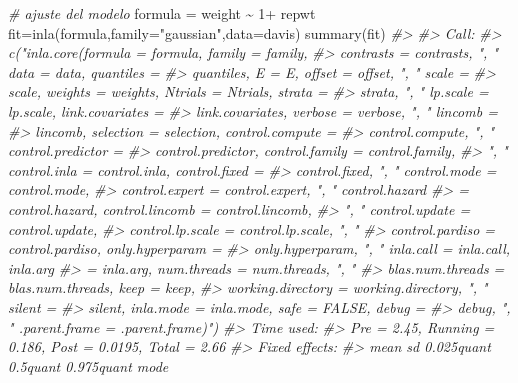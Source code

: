 \documentclass[
]{book}
\newenvironment{Shaded}{\begin{snugshade}}{\end{snugshade}}
\newcommand{\AttributeTok}[1]{\textcolor[rgb]{0.77,0.63,0.00}{#1}}
\newcommand{\CommentTok}[1]{\textcolor[rgb]{0.56,0.35,0.01}{\textit{#1}}}
\newcommand{\DecValTok}[1]{\textcolor[rgb]{0.00,0.00,0.81}{#1}}
\newcommand{\FunctionTok}[1]{\textcolor[rgb]{0.00,0.00,0.00}{#1}}
\newcommand{\NormalTok}[1]{#1}
\newcommand{\OtherTok}[1]{\textcolor[rgb]{0.56,0.35,0.01}{#1}}
\newcommand{\SpecialCharTok}[1]{\textcolor[rgb]{0.00,0.00,0.00}{#1}}
\newcommand{\StringTok}[1]{\textcolor[rgb]{0.31,0.60,0.02}{#1}}
\begin{document}
\begin{Shaded}
\begin{Highlighting}[]
\CommentTok{\# ajuste del modelo }
\NormalTok{formula }\OtherTok{=}\NormalTok{ weight }\SpecialCharTok{\textasciitilde{}} \DecValTok{1}\SpecialCharTok{+}\NormalTok{ repwt}
\NormalTok{fit}\OtherTok{=}\FunctionTok{inla}\NormalTok{(formula,}\AttributeTok{family=}\StringTok{"gaussian"}\NormalTok{,}\AttributeTok{data=}\NormalTok{davis)}
\FunctionTok{summary}\NormalTok{(fit)}
\CommentTok{\#\textgreater{} }
\CommentTok{\#\textgreater{} Call:}
\CommentTok{\#\textgreater{}    c("inla.core(formula = formula, family = family, }
\CommentTok{\#\textgreater{}    contrasts = contrasts, ", " data = data, quantiles = }
\CommentTok{\#\textgreater{}    quantiles, E = E, offset = offset, ", " scale = }
\CommentTok{\#\textgreater{}    scale, weights = weights, Ntrials = Ntrials, strata = }
\CommentTok{\#\textgreater{}    strata, ", " lp.scale = lp.scale, link.covariates = }
\CommentTok{\#\textgreater{}    link.covariates, verbose = verbose, ", " lincomb = }
\CommentTok{\#\textgreater{}    lincomb, selection = selection, control.compute = }
\CommentTok{\#\textgreater{}    control.compute, ", " control.predictor = }
\CommentTok{\#\textgreater{}    control.predictor, control.family = control.family, }
\CommentTok{\#\textgreater{}    ", " control.inla = control.inla, control.fixed = }
\CommentTok{\#\textgreater{}    control.fixed, ", " control.mode = control.mode, }
\CommentTok{\#\textgreater{}    control.expert = control.expert, ", " control.hazard }
\CommentTok{\#\textgreater{}    = control.hazard, control.lincomb = control.lincomb, }
\CommentTok{\#\textgreater{}    ", " control.update = control.update, }
\CommentTok{\#\textgreater{}    control.lp.scale = control.lp.scale, ", " }
\CommentTok{\#\textgreater{}    control.pardiso = control.pardiso, only.hyperparam = }
\CommentTok{\#\textgreater{}    only.hyperparam, ", " inla.call = inla.call, inla.arg }
\CommentTok{\#\textgreater{}    = inla.arg, num.threads = num.threads, ", " }
\CommentTok{\#\textgreater{}    blas.num.threads = blas.num.threads, keep = keep, }
\CommentTok{\#\textgreater{}    working.directory = working.directory, ", " silent = }
\CommentTok{\#\textgreater{}    silent, inla.mode = inla.mode, safe = FALSE, debug = }
\CommentTok{\#\textgreater{}    debug, ", " .parent.frame = .parent.frame)") }
\CommentTok{\#\textgreater{} Time used:}
\CommentTok{\#\textgreater{}     Pre = 2.45, Running = 0.186, Post = 0.0195, Total = 2.66 }
\CommentTok{\#\textgreater{} Fixed effects:}
\CommentTok{\#\textgreater{}              mean    sd 0.025quant 0.5quant 0.975quant mode}

\end{Highlighting}
\end{Shaded}
\end{document}
